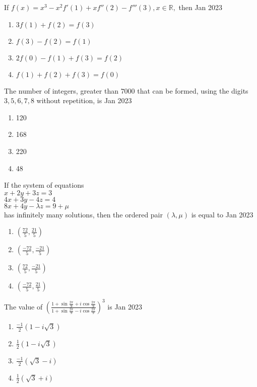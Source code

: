     \item If $ f(x)=x^{3}-x^{2}f'(1)+xf''(2)-f'''(3), x \in \mathbb{R}, $ then 
    \hfill{Jan 2023}\begin{enumerate}
        \item $ 3f(1) + f(2) = f(3) $
        \item $ f(3)-f(2) = f(1) $
        \item $ 2f(0)-f(1) + f(3) = f(2) $
        \item $ f(1) + f(2) + f(3) = f(0) $
    \end{enumerate}
    \item The number of integers, greater than $7000$ that can
be formed, using the digits $3, 5, 6, 7, 8$ without
repetition, is
\hfill{Jan 2023}\begin{enumerate}
    \item 120
    \item 168
    \item 220
    \item 48
\end{enumerate}
    \item If the system of equations \\
 $ x + 2y + 3z = 3$ \\
$ 4x + 3y-4z = 4$ \\
 $8x + 4y-\lambda z = 9 + \mu $ \\ 
 has infinitely many solutions, then the ordered pair
$(\lambda, \mu)$ is equal to
\hfill{Jan 2023}\begin{enumerate}
    \item $ \left( \frac{72}{5},\frac{21}{5} \right)$
    \item $ \left( \frac{-72}{5},\frac{-21}{5} \right)$
    \item $ \left( \frac{72}{5},\frac{-21}{5} \right)$
    \item $ \left( \frac{-72}{5},\frac{21}{5} \right)$
\end{enumerate}
\item The value of $\left( \frac{1+\sin{\frac{2\pi}{9}}+i\cos{\frac{2\pi}{9}}}{1+\sin{\frac{2\pi}{9}}-i\cos{\frac{2\pi}{9}}} \right)^{3}$ is
\hfill{Jan 2023}\begin{enumerate}
    \item $\frac{-1}{2} (1-i\sqrt{3})$
    \item $ \frac{1}{2} (1-i\sqrt{3})$
    \item $ \frac{-1}{2} (\sqrt{3}-i) $
    \item $ \frac{1}{2} (\sqrt{3}+i) $
\end{enumerate}
